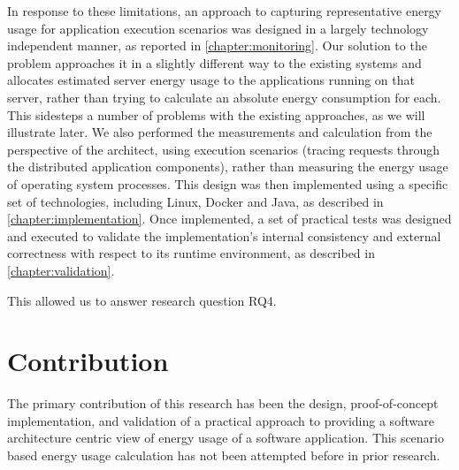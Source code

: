 In response to these limitations, an approach to capturing representative energy usage for application execution scenarios was designed in a largely technology independent manner, as reported in \cref{chapter:monitoring}.  Our solution to the problem approaches it in a slightly different way to the existing systems and allocates estimated server energy usage to the applications running on that server, rather than trying to calculate an absolute energy consumption for each.  This sidesteps a number of problems with the existing approaches, as we will illustrate later.  We also performed the measurements and calculation from the perspective of the architect, using execution scenarios (tracing requests through the distributed application components), rather than measuring the energy usage of operating system processes. This design was then implemented using a specific set of technologies, including Linux, Docker and Java, as described in \cref{chapter:implementation}.  Once implemented, a set of practical tests was designed and executed to validate the implementation's internal consistency and external correctness with respect to its runtime environment, as described in \cref{chapter:validation}.

This allowed us to answer research question RQ4.

\section{Contribution}

The primary contribution of this research has been the design, proof-of-concept implementation, and validation of a practical approach to providing a software architecture centric view of energy usage of a software application.  This scenario based energy usage calculation has not been attempted before in prior research.

